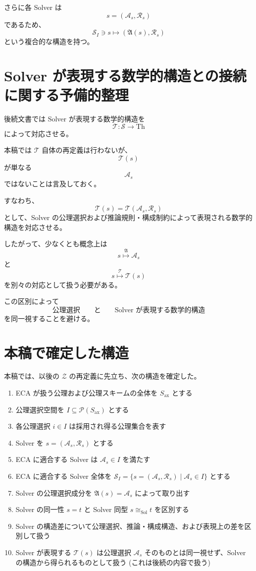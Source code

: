 \documentclass[a4paper,11pt]{article}
\newcommand{\Solver}{\mathcal{S}}
\newcommand{\Ax}{S_{\mathrm{ax}}}
\newcommand{\Sel}{I}
\newcommand{\Th}{\mathrm{Th}}
\begin{document}
さらに各 Solver は
\[
s=(\mathcal{A}_s,\mathcal{R}_s)
\]
であるため、
\[
\boxed{
\Solver_{\Sel}
\ni s
\longmapsto
\left(
\mathfrak{A}(s),\mathcal{R}_s
\right)
}
\]
という複合的な構造を持つ。

\section{Solver が表現する数学的構造との接続に関する予備的整理}

後続文書では Solver が表現する数学的構造を
\[
\mathcal{T}:\Solver\longrightarrow\Th
\]
によって対応させる。

本稿では $\mathcal{T}$ 自体の再定義は行わないが、
\[
\mathcal{T}(s)
\]
が単なる
\[
\mathcal{A}_s
\]
ではないことは言及しておく。

すなわち、
\[
\boxed{
\mathcal{T}(s)
=
\mathcal{T}(\mathcal{A}_s,\mathcal{R}_s)
}
\]
として、Solver の公理選択および推論規則・構成制約によって表現される数学的構造を対応させる。

したがって、少なくとも概念上は
\[
s
\overset{\mathfrak{A}}{\longmapsto}
\mathcal{A}_s
\]
と
\[
s
\overset{\mathcal{T}}{\longmapsto}
\mathcal{T}(s)
\]
を別々の対応として扱う必要がある。

この区別によって
\[
\text{公理選択} \qquad \text{と} \qquad \text{Solver が表現する数学的構造}
\]
を同一視することを避ける。

\section{本稿で確定した構造}

本稿では、以後の $\mathcal{Z}$ の再定義に先立ち、次の構造を確定した。

\begin{enumerate}
\item ECA が扱う公理および公理スキームの全体を $\Ax$ とする
\item 公理選択空間を $\Sel\subseteq\mathcal{P}(\Ax)$ とする
\item 各公理選択 $i\in\Sel$ は採用され得る公理集合を表す
\item Solver を $s=(\mathcal{A}_s,\mathcal{R}_s)$ とする
\item ECA に適合する Solver は $\mathcal{A}_s\in\Sel$ を満たす
\item ECA に適合する Solver 全体を $\Solver_{\Sel} = \{s=(\mathcal{A}_s,\mathcal{R}_s) \mid \mathcal{A}_s\in\Sel\}$ とする
\item Solver の公理選択成分を $\mathfrak{A}(s)=\mathcal{A}_s$ によって取り出す
\item Solver の同一性 $s=t$ と Solver 同型 $s\cong_{\mathrm{Sol}}t$ を区別する
\item Solver の構造差について公理選択、推論・構成構造、および表現上の差を区別して扱う
\item Solver が表現する $\mathcal{T}(s)$ は公理選択 $\mathcal{A}_s$ そのものとは同一視せず、Solver の構造から得られるものとして扱う (これは後続の内容で扱う)
\end{enumerate}
\end{document}
